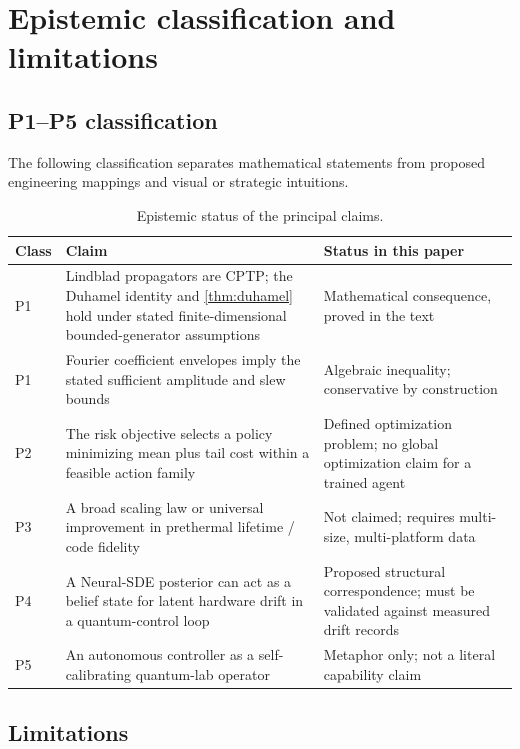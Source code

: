 \documentclass[10pt,twoside]{article}
\begin{document}
\section{Epistemic classification and limitations}

\subsection{P1--P5 classification}

The following classification separates mathematical statements from proposed engineering mappings and visual or strategic intuitions.

\begin{table}[t]
\centering\small
\caption{Epistemic status of the principal claims.}
\label{tab:pclassification}
\begin{tabularx}{\textwidth}{p{}p{}X}
\toprule
Class & Claim & Status in this paper \\
\midrule
P1 & Lindblad propagators are CPTP; the Duhamel identity and \cref{thm:duhamel} hold under stated finite-dimensional bounded-generator assumptions & Mathematical consequence, proved in the text \\
P1 & Fourier coefficient envelopes imply the stated sufficient amplitude and slew bounds & Algebraic inequality; conservative by construction \\
P2 & The risk objective selects a policy minimizing mean plus tail cost within a feasible action family & Defined optimization problem; no global optimization claim for a trained agent \\
P3 & A broad scaling law or universal improvement in prethermal lifetime / code fidelity & Not claimed; requires multi-size, multi-platform data \\
P4 & A Neural-SDE posterior can act as a belief state for latent hardware drift in a quantum-control loop & Proposed structural correspondence; must be validated against measured drift records \\
P5 & An autonomous controller as a self-calibrating quantum-lab operator & Metaphor only; not a literal capability claim \\
\bottomrule
\end{tabularx}
\end{table}

\subsection{Limitations}
\end{document}
